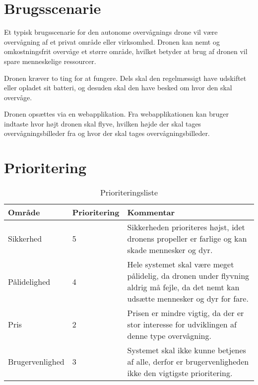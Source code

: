 \section{Brugsscenarie}

Et typisk brugsscenarie for den autonome overvågnings drone vil være overvågning af et privat område eller virksomhed. Dronen kan nemt og omkostningsfrit overvåge et større område, hvilket betyder at brug af dronen vil spare menneskelige ressourcer. 

Dronen kræver to ting for at fungere. Dels skal den regelmæssigt have udskiftet eller opladet sit batteri, og desuden skal den have besked om hvor den skal overvåge.

Dronen opsættes via en webapplikation. Fra webapplikationen kan bruger indtaste hvor højt dronen skal flyve, hvilken højde der skal tages overvågningsbilleder fra og hvor der skal tages overvågningsbilleder.



\section{Prioritering}

\begin{table}[H]
	\centering
		\begin{tabular}{|l|l|p{7 cm}|} 
		\hline
			Område & Prioritering & Kommentar \\ \hline
			Sikkerhed 		& 5 	& Sikkerheden prioriteres højst, idet dronens propeller er farlige og kan skade mennesker og dyr.   \\ \hline
			
			Pålidelighed 	& 4 	& Hele systemet skal være meget pålidelig, da dronen under flyvning aldrig må fejle, da det nemt kan udsætte mennesker og dyr for fare.  \\ \hline
			
			Pris 			& 2 	& Prisen er mindre vigtig, da der er stor interesse for udviklingen af denne type overvågning.    \\ \hline
			
			Brugervenlighed & 3 	& Systemet skal ikke kunne betjenes af alle, derfor er brugervenligheden ikke den vigtigste prioritering. \\ \hline
		\end{tabular}
	\caption{Prioriteringsliste}
\end{table}
